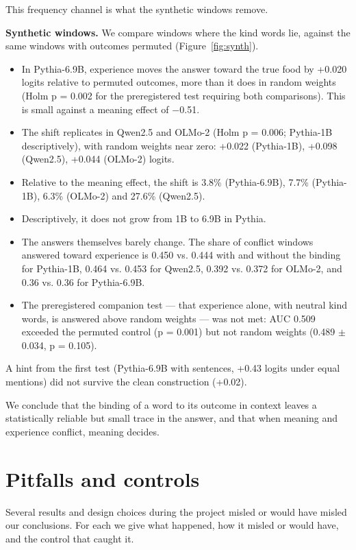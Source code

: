 \documentclass[11pt]{article}
\begin{document}
This frequency channel is what the synthetic windows remove.

\textbf{Synthetic windows.} We compare windows where the kind words lie, against the same windows with outcomes permuted (Figure~\ref{fig:synth}).
\begin{itemize}
\item In Pythia-6.9B, experience moves the answer toward the true food by +0.020 logits relative to permuted outcomes, more than it does in random weights (Holm p = 0.002 for the preregistered test requiring both comparisons). This is small against a meaning effect of $-$0.51.
\item The shift replicates in Qwen2.5 and OLMo-2 (Holm p = 0.006; Pythia-1B descriptively), with random weights near zero: +0.022 (Pythia-1B), +0.098 (Qwen2.5), +0.044 (OLMo-2) logits.
\item Relative to the meaning effect, the shift is 3.8\% (Pythia-6.9B), 7.7\% (Pythia-1B), 6.3\% (OLMo-2) and 27.6\% (Qwen2.5).
\item Descriptively, it does not grow from 1B to 6.9B in Pythia.
\item The answers themselves barely change. The share of conflict windows answered toward experience is 0.450 vs. 0.444 with and without the binding for Pythia-1B, 0.464 vs. 0.453 for Qwen2.5, 0.392 vs. 0.372 for OLMo-2, and 0.36 vs. 0.36 for Pythia-6.9B.
\item The preregistered companion test --- that experience alone, with neutral kind words, is answered above random weights --- was not met: AUC 0.509 exceeded the permuted control (p = 0.001) but not random weights (0.489 $\pm$ 0.034, p = 0.105).
\end{itemize}

A hint from the first test (Pythia-6.9B with sentences, +0.43 logits under equal mentions) did not survive the clean construction (+0.02).

We conclude that the binding of a word to its outcome in context leaves a statistically reliable but small trace in the answer, and that when meaning and experience conflict, meaning decides.


\section{Pitfalls and controls}



Several results and design choices during the project misled or would have misled our conclusions. For each we give what happened, how it misled or would have, and the control that caught it.
\end{document}
